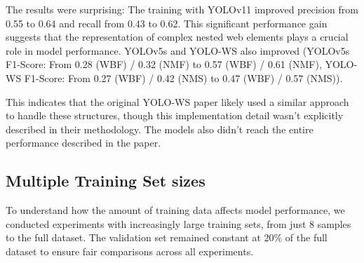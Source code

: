 \documentclass{article}  %
\begin{document}
The results were surprising: The training with YOLOv11 improved precision from 0.55 to 0.64 and recall from 0.43 to 0.62. This significant performance gain suggests that the representation of complex nested web elements plays a crucial role in model performance. YOLOv5s and YOLO-WS also improved (YOLOv5s F1-Score: From 0.28 (WBF) / 0.32 (NMF) to 0.57 (WBF) / 0.61 (NMF), YOLO-WS F1-Score: From 0.27 (WBF) / 0.42 (NMS) to 0.47 (WBF) / 0.57 (NMS)). 

This indicates that the original YOLO-WS paper likely used a similar approach to handle these structures, though this implementation detail wasn't explicitly described in their methodology. The models also didn't reach the entire performance described in the paper.


\subsection{Multiple Training Set sizes}

To understand how the amount of training data affects model performance, we conducted experiments with increasingly large training sets, from just 8 samples to the full dataset. The validation set remained constant at 20\% of the full dataset to ensure fair comparisons across all experiments.

\end{document}
